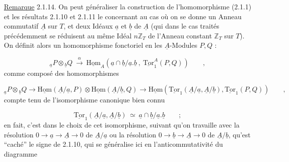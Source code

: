 \underline{Remarque} 2.1.14. On peut généraliser la construction de l'homomorphisme (2.1.1) et les résultats 2.1.10 et 2.1.11 le concernant au cas où on se donne un Anneau commutatif $\underline{A}$ sur $T$, et deux Idéaux $\underline{a}$ et $\underline{b}$ de $\underline{A}$ (qui dans le cas traités précédemment se réduisent au même Idéal $n\mathbb{Z}_T$ de
l'Anneau constant $\mathbb{Z}_T$ sur $T$). On définit alors un homomorphisme fonctoriel en les $\underline{A}$-Modules $P,Q$ :

\begin{equation}\tag{2.1.14.1}
{}_{\underline{a}}P \otimes {}_{\underline{b}}Q \ \overset{\alpha}{\longrightarrow}\ \underline{\mathrm{Hom}}_A(\underline{a} \cap \underline{b}/\underline{a}.\underline{b}\ ,\ \underline{\mathrm{Tor}}^A_1(P,Q)) \qquad ,
\end{equation}
comme composé des homomorphismes

\begin{equation*}
{}_{\underline{a}}P \otimes {}_{\underline{b}}Q \to \underline{\mathrm{Hom}}(\underline{A}/\underline{a},P) \otimes \underline{\mathrm{Hom}}(\underline{A}/\underline{b},Q) \longrightarrow \underline{\mathrm{Hom}}(\underline{\mathrm{Tor}}_1(\underline{A}/\underline{a},\underline{A}/\underline{b}),\underline{\mathrm{Tor}}_1(P,Q)) \qquad ,
\end{equation*}
compte tenu de l'isomorphisme canonique bien connu

\begin{equation}\tag{2.1.14.2}
\underline{\mathrm{Tor}}_1(\underline{A}/\underline{a},\underline{A}/\underline{b}) \ \simeq\ \underline{a} \cap \underline{b}/\underline{a}.\underline{b} \qquad ;
\end{equation}
en fait, c'est dans le choix de cet isomorphisme, suivant qu'on travaille avec la résolution $0 \longrightarrow \underline{a} \longrightarrow \underline{A} \longrightarrow 0$ de $\underline{A}/\underline{a}$ ou la résolution $0 \longrightarrow \underline{b} \to \underline{A} \to 0$ de $\underline{A}/\underline{b}$, qu'est ``caché'' le signe de 2.1.10, qui se généralise ici en l'anticommutativité du diagramme

